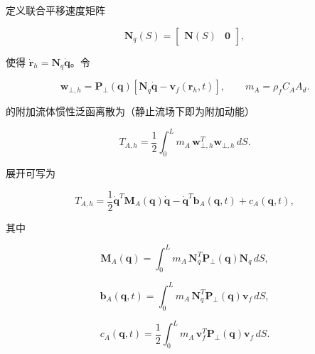 定义联合平移速度矩阵

\begin{equation}
\label{eq:galerkin-2-53}
\mathbf{N}_{q}(S) = \begin{bmatrix}
\mathbf{N}(S) & \mathbf{0}
\end{bmatrix},
\end{equation}

使得 \({\dot{\mathbf{r}}}_{h} = \mathbf{N}_{q}\dot{\mathbf{q}}\)。令

\begin{equation}
\label{eq:galerkin-2-54}
\mathbf{w}_{\bot,h} = \mathbf{P}_{\bot}\left( \mathbf{q} \right)\left\lbrack \mathbf{N}_{q}\dot{\mathbf{q}} - \mathbf{v}_{f}\left( \mathbf{r}_{h},t \right) \right\rbrack,\quad\quad m_{A} = \rho_{f}C_{A}A_{d}.
\end{equation}

的附加流体惯性泛函离散为（静止流场下即为附加动能）

\begin{equation}
\label{eq:galerkin-2-55}
\boxed{T_{A,h} = \frac{1}{2}\int_{0}^{L}m_{A}\,\mathbf{w}_{\bot,h}^{T}\mathbf{w}_{\bot,h}\, dS.}
\end{equation}

展开可写为

\begin{equation}
\label{eq:galerkin-2-56}
T_{A,h} = \frac{1}{2}{\dot{\mathbf{q}}}^{T}\mathbf{M}_{A}\left( \mathbf{q} \right)\dot{\mathbf{q}} - {\dot{\mathbf{q}}}^{T}\mathbf{b}_{A}\left( \mathbf{q},t \right) + c_{A}\left( \mathbf{q},t \right),
\end{equation}

其中

\begin{equation}
\label{eq:galerkin-2-57}
\boxed{\mathbf{M}_{A}\left( \mathbf{q} \right) = \int_{0}^{L}m_{A}\,\mathbf{N}_{q}^{T}\mathbf{P}_{\bot}\left( \mathbf{q} \right)\mathbf{N}_{q}\, dS,}
\end{equation}

\begin{equation}
\label{eq:galerkin-2-58}
\mathbf{b}_{A}\left( \mathbf{q},t \right) = \int_{0}^{L}m_{A}\,\mathbf{N}_{q}^{T}\mathbf{P}_{\bot}\left( \mathbf{q} \right)\mathbf{v}_{f}\, dS,
\end{equation}

\begin{equation}
\label{eq:galerkin-2-59}
c_{A}\left( \mathbf{q},t \right) = \frac{1}{2}\int_{0}^{L}m_{A}\,\mathbf{v}_{f}^{T}\mathbf{P}_{\bot}\left( \mathbf{q} \right)\mathbf{v}_{f}\, dS.
\end{equation}

